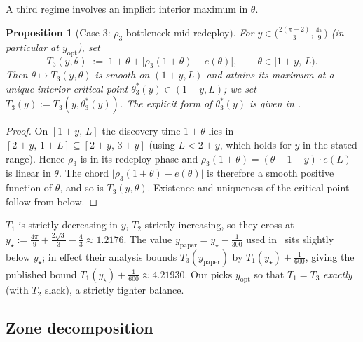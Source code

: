\documentclass[11pt]{article}
\theoremstyle{plain}
\newtheorem{proposition}[theorem]{Proposition}
\theoremstyle{definition}
\theoremstyle{remark}
\begin{document}
A third regime involves an implicit interior maximum in $\theta$.

\begin{proposition}[Case 3: $\rho_3$ bottleneck mid-redeploy]
\label{prop:case3-def}
For $y \in \bigl(\frac{2(\pi-2)}{3}, \frac{4\pi}{9}\bigr)$ (in
particular at $y_{\mathrm{opt}}$), set
\[
T_3(y,\theta) \;:=\; 1 + \theta + \bigl\lvert\rho_3(1 + \theta) - e(\theta)\bigr\rvert,
\qquad \theta \in [1+y,\, L).
\]
Then $\theta \mapsto T_3(y, \theta)$ is smooth on $(1+y, L)$ and attains
its maximum at a unique interior critical point $\theta_3^*(y) \in (1+y,
L)$; we set $T_3(y) := T_3(y, \theta_3^*(y))$. The explicit form of
$\theta_3^*(y)$ is given in .
\end{proposition}

\begin{proof}
On $[1+y,\, L]$ the discovery time $1 + \theta$ lies in $[2+y,\, 1+L]
\subseteq [2+y,\, 3+y]$ (using $L < 2 + y$, which holds for $y$ in the
stated range). Hence $\rho_3$ is in its redeploy phase and
$\rho_3(1+\theta) = (\theta - 1 - y) \cdot e(L)$ is linear in
$\theta$. The chord $\lvert\rho_3(1+\theta) - e(\theta)\rvert$ is
therefore a smooth positive function of $\theta$, and so is $T_3(y,
\theta)$. Existence and uniqueness of the critical point follow from
 below.
\end{proof}

$T_1$ is strictly decreasing in $y$, $T_2$ strictly increasing, so they
cross at
$y_\star := \frac{4\pi}{9} + \frac{2\sqrt 3}{3} - \frac{4}{3} \approx
1.2176$. The value
$y_{\mathrm{paper}} = y_\star - \frac{1}{300}$ used
in~\cite{czyzowicz2014} sits slightly below $y_\star$; in effect
their analysis bounds $T_3(y_{\mathrm{paper}})$ by $T_1(y_\star) +
\frac{1}{600}$, giving the published bound $T_1(y_\star) +
\frac{1}{600} \approx 4.21930$. Our  picks
$y_{\mathrm{opt}}$ so that $T_1 = T_3$ \emph{exactly} (with $T_2$
slack), a strictly tighter balance.

\subsection{Zone decomposition}
\end{document}
